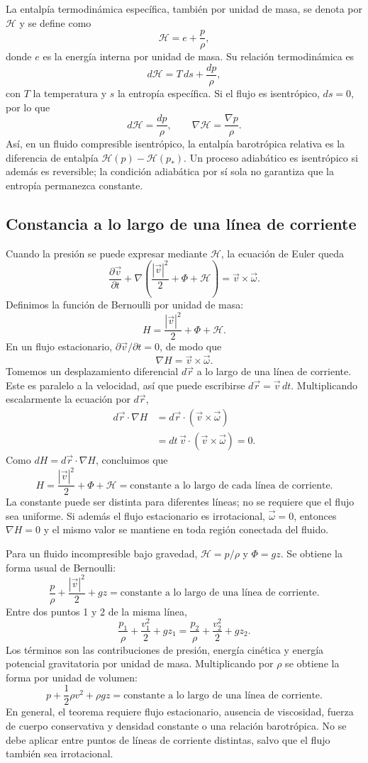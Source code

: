 La entalpía termodinámica específica, también por unidad de masa, se denota por $\mathcal H$ y se define como
\[
\mathcal H=e+\frac{p}{\rho},
\]
donde $e$ es la energía interna por unidad de masa. Su relación termodinámica es
\[
d\mathcal H=T\,ds+\frac{dp}{\rho},
\]
con $T$ la temperatura y $s$ la entropía específica. Si el flujo es isentrópico, $ds=0$, por lo que
\[
d\mathcal H=\frac{dp}{\rho},
\qquad
\nabla\mathcal H=\frac{\nabla p}{\rho}.
\]
Así, en un fluido compresible isentrópico, la entalpía barotrópica relativa es la diferencia de entalpía $\mathcal H(p)-\mathcal H(p_*)$. Un proceso adiabático es isentrópico si además es reversible; la condición adiabática por sí sola no garantiza que la entropía permanezca constante.

\subsection{Constancia a lo largo de una línea de corriente}

Cuando la presión se puede expresar mediante $\mathcal H$, la ecuación de Euler queda
\[
\frac{\partial\vec v}{\partial t}
+\nabla\left(\frac{|\vec v|^2}{2}+\Phi+\mathcal H\right)
=\vec v\times\vec\omega.
\]
Definimos la función de Bernoulli por unidad de masa:
\[
H=\frac{|\vec v|^2}{2}+\Phi+\mathcal H.
\]
En un flujo estacionario, $\partial\vec v/\partial t=0$, de modo que
\[
\nabla H=\vec v\times\vec\omega.
\]
Tomemos un desplazamiento diferencial $d\vec r$ a lo largo de una línea de corriente. Este es paralelo a la velocidad, así que puede escribirse $d\vec r=\vec v\,dt$. Multiplicando escalarmente la ecuación por $d\vec r$,
\[
\begin{aligned}
d\vec r\cdot\nabla H
&=d\vec r\cdot(\vec v\times\vec\omega)\\
&=dt\,\vec v\cdot(\vec v\times\vec\omega)=0.
\end{aligned}
\]
Como $dH=d\vec r\cdot\nabla H$, concluimos que
\[
\boxed{H
=\frac{|\vec v|^2}{2}+\Phi+\mathcal H
=\text{constante a lo largo de cada línea de corriente}.}
\]
La constante puede ser distinta para diferentes líneas; no se requiere que el flujo sea uniforme. Si además el flujo estacionario es irrotacional, $\vec\omega=0$, entonces $\nabla H=0$ y el mismo valor se mantiene en toda región conectada del fluido.

Para un fluido incompresible bajo gravedad, $\mathcal H=p/\rho$ y $\Phi=gz$. Se obtiene la forma usual de Bernoulli:
\[
\boxed{\frac{p}{\rho}+\frac{|\vec v|^2}{2}+gz
=\text{constante a lo largo de una línea de corriente}.}
\]
Entre dos puntos 1 y 2 de la misma línea,
\[
\frac{p_1}{\rho}+\frac{v_1^2}{2}+gz_1
=\frac{p_2}{\rho}+\frac{v_2^2}{2}+gz_2.
\]
Los términos son las contribuciones de presión, energía cinética y energía potencial gravitatoria por unidad de masa. Multiplicando por $\rho$ se obtiene la forma por unidad de volumen:
\[
\boxed{p+\frac12\rho v^2+\rho gz
=\text{constante a lo largo de una línea de corriente}.}
\]
En general, el teorema requiere flujo estacionario, ausencia de viscosidad, fuerza de cuerpo conservativa y densidad constante o una relación barotrópica. No se debe aplicar entre puntos de líneas de corriente distintas, salvo que el flujo también sea irrotacional.